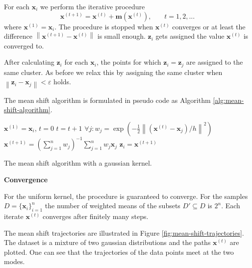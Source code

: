 \documentclass{article}
\newcommand{\norm}[1]{\left\lVert#1\right\rVert}
\begin{document}
For each $\bm{x}_i$ we perform the iterative procedure
\begin{equation}
\bm{x}^{(t+1)} = \bm{x}^{(t)} + \bm{m}\left(\bm{x}^{(t)}\right)\text{,}\qquad t = 1, 2, ...
\end{equation}
where $\bm{x}^{(1)} = \bm{x}_i$. The procedure is stopped when $\bm{x}^{(t)}$ converges or at least the difference $\norm{\bm{x}^{(t+1)} - \bm{x}^{(t)}}$ is small enough. $\bm{z}_i$ gets assigned the value $\bm{x}^{(t)}$ is converged to.

After calculating $\bm{z}_i$ for each $\bm{x}_i$, the points for which $\bm{z}_i = \bm{z}_j$ are assigned to the same cluster. As before we relax this by assigning the same cluster when $\norm{\bm{z}_i - \bm{x}_j} < \varepsilon$ holds.

The mean shift algorithm is formulated in pseudo code as Algorithm \ref{alg:mean-shift-algorithm}.
\begin{algorithm}
	\begin{algorithmic}[1]
			\State $\bm{x}^{(1)} = \bm{x}_i$, $t=0$
			\Repeat
				\State $t = t + 1$
				\State $\forall j: w_j = \exp(-\frac{1}{2} \norm{(\bm{x}^{(t)} - \bm{x}_j) / h}^2)$
				\State $\bm{x}^{(t+1)} = (\sum_{j=1}^n w_j)^{-1} \sum_{j=1}^n w_j \bm{x}_j$
			\Until{$\norm{\bm{x}^{(t+1)} - \bm{x}^{(t)}} < tol$}
			\State $\bm{z}_i = \bm{x}^{(t+1)}$
		\EndFor
		\State \Return {}
		\EndFunction
	\end{algorithmic}
	\caption[Mean shift algorithm]{The mean shift algorithm with a gaussian kernel.}
	\label{alg:mean-shift-algorithm}
\end{algorithm}

\textbf{Convergence}

For the uniform kernel, the procedure is guaranteed to converge. For the samples $D = \{\bm{x}_i\}_{i=1}^n$ the number of weighted means of the subsets $D' \subseteq D$ is $2^n$. Each iterate $\bm{x}^{(t)}$ converges after finitely many steps.

The mean shift trajectories are illustrated in Figure \ref{fig:mean-shift-trajectories}. The dataset is a mixture of two gaussian distributions and the paths $\bm{x}^{(t)}$ are plotted. One can see that the trajectories of the data points meet at the two modes.
\end{document}
